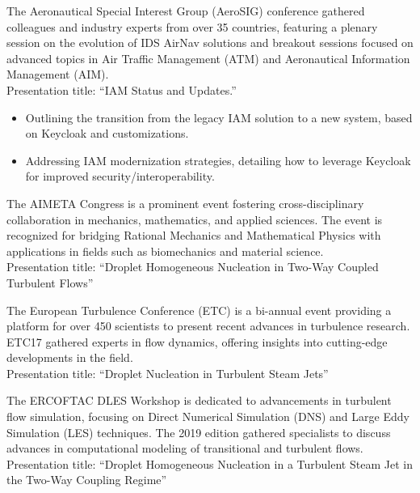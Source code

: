 	The Aeronautical Special Interest Group (AeroSIG) conference gathered colleagues and industry experts from over 35 countries, featuring a plenary session on the evolution of IDS AirNav solutions and breakout sessions focused on advanced topics in Air Traffic Management (ATM) and Aeronautical Information Management (AIM). \\
	\medskip
	Presentation title: ``IAM Status and Updates.'' \\
	\smallskip
	\begin{itemize}
		\item Outlining the transition from the legacy IAM solution to a new system, based on Keycloak and customizations.
		\item Addressing IAM modernization strategies, detailing how to leverage Keycloak for improved security/interoperability.
	\end{itemize}

	\divider

	The AIMETA Congress is a prominent event fostering cross-disciplinary collaboration in mechanics, mathematics, and applied sciences. The event is recognized for bridging Rational Mechanics and Mathematical Physics with applications in fields such as biomechanics and material science. \\
	\medskip
	Presentation title: ``Droplet Homogeneous Nucleation in Two-Way Coupled Turbulent Flows''

	\divider

	The European Turbulence Conference (ETC) is a bi-annual event providing a platform for over 450 scientists to present recent advances in turbulence research. ETC17 gathered experts in flow dynamics, offering insights into cutting-edge developments in the field. \\
	\medskip
	Presentation title: ``Droplet Nucleation in Turbulent Steam Jets''

	\divider

	The ERCOFTAC DLES Workshop is dedicated to advancements in turbulent flow simulation, focusing on Direct Numerical Simulation (DNS) and Large Eddy Simulation (LES) techniques. The 2019 edition gathered specialists to discuss advances in computational modeling of transitional and turbulent flows. \\
	\medskip
	Presentation title: ``Droplet Homogeneous Nucleation in a Turbulent Steam Jet in the Two-Way Coupling Regime''


